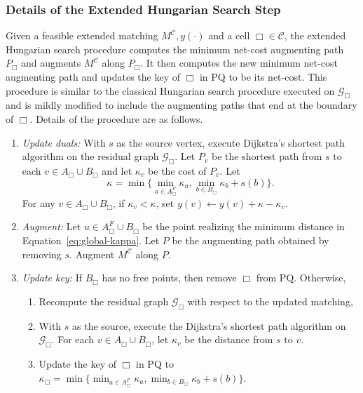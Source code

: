 \documentclass[11pt,onecolumn]{article}
\def\mcC{{\mathcal{C}}}
\def\mcG{{\mathcal{G}}}
\newcommand{\freeofcell}[2]{{#1}_{#2}^F}
\newcommand{\cell}{\Box}
\newcommand{\pq}{\mathrm{PQ}}
\begin{document}
\subsubsection{Details of the Extended Hungarian Search Step}\label{subsubsec:global} 
Given a feasible extended matching $M^\mcC, y(\cdot)$  and a cell $\cell\in\mcC$, the extended Hungarian search procedure computes the minimum net-cost augmenting path $P_\cell$ and augments $M^\mcC$ along $P_\cell$. It then computes the new minimum net-cost augmenting path and updates the key of $\cell$ in $\pq$ to be its net-cost. 
This procedure is similar to the classical Hungarian search procedure executed on $\mcG_\cell$ and is mildly modified to include the augmenting paths that end at the boundary of $\cell$. 
Details of the procedure are as follows. 
\begin{enumerate}
\item {\it Update duals:} With $s$ as the source vertex, execute Dijkstra's shortest path algorithm on the residual graph $\mcG_\cell$. Let $P_v$ be the shortest path from $s$ to each $v\in A_\cell\cup B_\cell$ and let $\kappa_v$ be the cost of $P_v$. Let
\begin{equation}\label{eq:global-kappa}
    \kappa = \min\{ \min_{a\in \freeofcell{A}{\cell}}\kappa_a, \min_{b\in B_\cell}\kappa_b + s(b)\}.
\end{equation}
For any $v \in A_\cell\cup B_\cell$, if $\kappa_v < \kappa$, set $ y(v) \leftarrow y(v) +\kappa - \kappa_v$.
\item {\it Augment:} Let $u\in \freeofcell{A}{\cell}\cup B_\cell$ be the point realizing the minimum distance in Equation~\eqref{eq:global-kappa}. Let $P$ be the augmenting path obtained by removing $s$. Augment $M^\mcC$ along $P$. 
\item {\it Update key:} If $B_\cell$ has no free points, then remove $\cell$ from $\pq$. Otherwise,
\begin{enumerate}
    \item Recompute the residual graph $\mcG_{\cell}$ with respect to the updated matching,
    \item With $s$ as the source, execute the Dijkstra's shortest path algorithm on $\mcG_\cell$. For each $v \in A_\cell\cup B_\cell$, let $\kappa_v$ be the distance from $s$ to $v$.
    \item  Update the key of $\cell$ in $\pq$ to $\kappa_\cell = \min\{ \min_{a\in \freeofcell{A}{\cell}}\kappa_a, \min_{b\in B_\cell}\kappa_b + s(b)\}$.
\end{enumerate}   
\end{enumerate}
%
\end{document}
